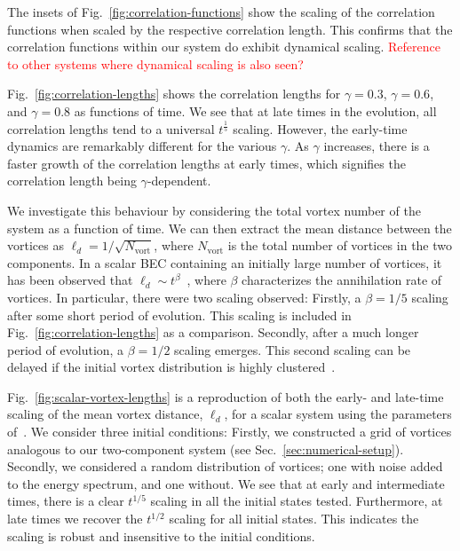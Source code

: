 The insets of Fig.~\ref{fig:correlation-functions} show the scaling of the
correlation functions when scaled by the respective correlation length.
This confirms that the correlation functions within our system do exhibit
dynamical scaling. \textcolor{red}{Reference to other systems where dynamical
    scaling is also seen?} \par
Fig.~\ref{fig:correlation-lengths} shows the correlation lengths for
\(\gamma=0.3\), \(\gamma=0.6\), and \(\gamma=0.8\) as functions of time.
We see that at late times in the evolution, all correlation lengths tend to a
universal \(t^\frac{1}{5}\) scaling.
However, the early-time dynamics are remarkably different for the various
\(\gamma \).
As \(\gamma \) increases, there is a faster growth of the correlation lengths at
early times, which signifies the correlation length being \(\gamma \)-dependent.

We investigate this behaviour by considering the total vortex number of
the system as a function of time.
We can then extract the mean distance between the vortices as
\(\ell_d=1/\sqrt{N_\mathrm{vort}}\), where \(N_\mathrm{vort}\) is the total
number of vortices in the two components.
In a scalar BEC containing an initially large number of vortices, it has been
observed that \(\ell_d \sim t^\beta \)~\cite{Karl2017}, where \(\beta \)
characterizes the annihilation rate of vortices.
In particular, there were two scaling observed: Firstly, a \(\beta=1/5\) scaling
after some short period of evolution.
This scaling is included in Fig.~\ref{fig:correlation-lengths} as a comparison.
Secondly, after a much longer period of evolution, a \(\beta=1/2\) scaling
emerges.
This second scaling can be delayed if the initial vortex distribution is
highly clustered~\cite{Karl2017}.

Fig.~\ref{fig:scalar-vortex-lengths} is a reproduction of both the early- and
late-time scaling of the mean vortex distance, \(\ell_d\), for a scalar system
using the parameters of~\cite{Karl2017}.
We consider three initial conditions: Firstly, we constructed a grid of vortices
analogous to our two-component system (see Sec.~\ref{sec:numerical-setup}).
Secondly, we considered a random distribution of vortices; one with noise
added to the energy spectrum, and one without.
We see that at early and intermediate times, there is a clear \(t^{1/5}\)
scaling in all the initial states tested.
Furthermore, at late times we recover the \(t^{1/2}\) scaling for all initial
states.
This indicates the scaling is robust and insensitive to the initial conditions.

